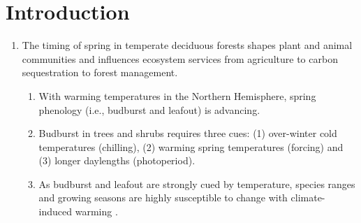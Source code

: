 \documentclass{article}\usepackage[]{graphicx}\usepackage[]{color}
\begin{document}
\section*{Introduction}
\begin{enumerate}
\item The timing of spring in temperate deciduous forests shapes plant and animal communities and influences ecosystem services from agriculture to carbon sequestration to forest management.
  \begin{enumerate}
  \item With warming temperatures in the Northern Hemisphere, spring phenology (i.e., budburst and leafout) is advancing.
  \item Budburst in trees and shrubs requires three cues: (1) over-winter cold temperatures (chilling), (2) warming spring temperatures (forcing) and (3) longer daylengths (photoperiod).
  \item As budburst and leafout are strongly cued by temperature, species ranges and growing seasons are highly susceptible to change with climate-induced warming \citep{Chuine2001}.
  \end{enumerate}
  

\end{enumerate}
\end{document}
